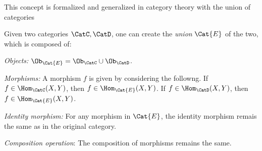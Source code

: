
\noindent This concept is formalized and generalized in category theory with the union of categories

\begin{shaded}
\begin{definition}
Given two categories $\CatC,\CatD$, one can create the \emph{union} $\Cat{E}$ of the two, which is composed of:
\begin{compactenum}
\item \emph{Objects:} $\Ob_\Cat{E}=\Ob_\CatC \cup \Ob_\CatD$.
\item \emph{Morphisms:} A morphism $f$ is given by considering the followng. If $f\in \Hom_\CatC(X,Y)$, then $f\in \Hom_\Cat{E}(X,Y)$. If $f\in \Hom_\CatD(X,Y)$, then $f\in \Hom_\Cat{E}(X,Y)$.
\item \emph{Identity morphism:} For any morphism in $\Cat{E}$, the identity morphism remais the same as in the original category.
\item \emph{Composition operation}: The composition of morphisms remains the same.
\end{compactenum}
\end{definition}
\end{shaded}

%
%
%

